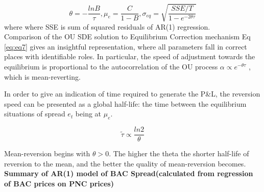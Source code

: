 \documentclass[a4paper, 11pt]{article}
\begin{document}
$$ \theta = - \frac{ln B}{\tau}, \mu_e = \frac{C}{1-B}, \sigma_{eq} = \sqrt{\frac{SSE/T}{1- e^{-2\theta\tau}}}$$
where where SSE is sum of squared residuals of AR(1) regression.\\

Comparison of the OU SDE solution to Equilibrium Correction mechanism Eq \ref{eq:eq7} gives an insightful representation, where all parameters fall in correct places with identifiable roles. In particular, the speed of adjustment towards the equilibrium is proportional to the autocorrelation of the OU process $\alpha \propto e^{-\theta\tau}$ , which is mean-reverting.

In order to give an indication of time required to generate the P\&L, the reversion speed can be presented as a global half-life: the time between the equilibrium situations of spread $e_t$ being at $\mu_e$.

$$\tilde{\tau} \propto \frac{ln 2}{\theta}$$

Mean-reversion begins with $\theta > 0$. The higher the theta the shorter half-life of reversion to the mean, and the better the quality of mean-reversion becomes.\\

\textbf{Summary of AR(1) model of BAC Spread(calculated from regression of BAC prices on PNC prices)}
\end{document}
